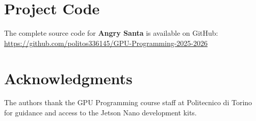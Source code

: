 \documentclass[conference]{IEEEtran}
\begin{document}
\section*{Project Code}
The complete source code for \textbf{Angry Santa} is available on GitHub: \url{https://github.com/politos336145/GPU-Programming-2025-2026}

\section*{Acknowledgments}
The authors thank the GPU Programming course staff at Politecnico di Torino for guidance and access to the Jetson Nano development kits.

\nocite{cuda_programming_guide,cuda_best_practices,cuda_toolkit,nsight_tools,cub_library,vulkan_api,dear_imgui}



\end{document}
